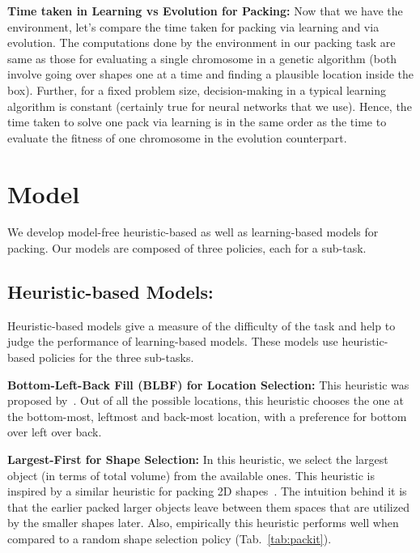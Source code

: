 \documentclass{article}
\begin{document}
\noindent\textbf{Time taken in Learning vs Evolution for Packing: }Now that we have the environment, let's compare the time taken for packing via learning and via evolution. The computations done by the environment in our packing task are same as those for evaluating a single chromosome in a genetic algorithm (both involve going over shapes one at a time and finding a plausible location inside the box). Further, for a fixed problem size, decision-making in a typical learning algorithm is constant (certainly true for neural networks that we use). Hence, the time taken to solve one pack via learning is in the same order as the time to evaluate the fitness of one chromosome in the evolution counterpart.

\section{Model}
\label{sec:model}
We develop model-free heuristic-based as well as learning-based models for packing. Our models are composed of three policies, each for a sub-task.

\subsection{Heuristic-based Models:}
Heuristic-based models give a measure of the difficulty of the task and help to judge the performance of learning-based models. These models use heuristic-based policies for the three sub-tasks.

\noindent\textbf{Bottom-Left-Back Fill (BLBF) for Location Selection: }This heuristic was proposed by~\cite{tiwari2010fast}. Out of all the possible locations, this heuristic chooses the one at the bottom-most, leftmost and back-most location, with a preference for bottom over left over back.

\noindent\textbf{Largest-First for Shape Selection: }In this heuristic, we select the largest object (in terms of total volume) from the available ones. This heuristic is inspired by a similar heuristic for packing 2D shapes~\cite{chen2003two}. The intuition behind it is that the earlier packed larger objects leave between them spaces that are utilized by the smaller shapes later. Also, empirically this heuristic performs well when compared to a random shape selection policy (Tab.~\ref{tab:packit}).
\end{document}

